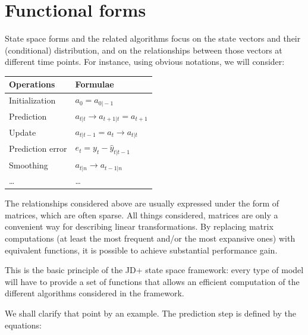 \documentclass[
  letterpaper,
  DIV=11,
  numbers=noendperiod]{scrreprt}
\begin{document}
\section{Functional forms}\label{functional-forms}

State space forms and the related algorithms focus on the state vectors
and their (conditional) distribution, and on the relationships between
those vectors at different time points. For instance, using obvious
notations, we will consider:

\begin{longtable}[]{@{}
  >{\raggedright\arraybackslash}p{}
  >{\raggedright\arraybackslash}p{}@{}}
\toprule\noalign{}
\begin{minipage}[b]{\linewidth}\raggedright
Operations
\end{minipage} & \begin{minipage}[b]{\linewidth}\raggedright
Formulae
\end{minipage} \\
\midrule\noalign{}
\endhead
\bottomrule\noalign{}
\endlastfoot
Initialization & \(a_0 = a_{0\vert -1}\) \\
Prediction & \(a_{t \vert t}\rightarrow a_{t+1 \vert t}=a_{t+1}\) \\
Update & \(a_{t \vert t-1}=a_t \rightarrow a_{t \vert t}\) \\
Prediction error & \(e_t=y_t- \hat y_{t \vert t-1}\) \\
Smoothing & \(a_{t \vert n} \rightarrow a_{t-1\vert n}\) \\
\ldots{} & \ldots{} \\
\end{longtable}

The relationships considered above are usually expressed under the form
of matrices, which are often sparse. All things considered, matrices are
only a convenient way for describing linear transformations. By
replacing matrix computations (at least the most frequent and/or the
most expansive ones) with equivalent functions, it is possible to
achieve substantial performance gain.

This is the basic principle of the JD+ state space framework: every type
of model will have to provide a set of functions that allows an
efficient computation of the different algorithms considered in the
framework.

We shall clarify that point by an example. The prediction step is
defined by the equations:
\end{document}
